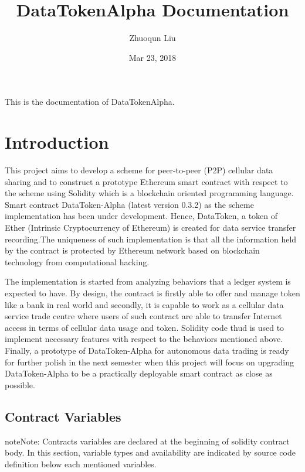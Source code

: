 \documentclass[letterpaper,10pt,english]{sphinxmanual}
\title{DataTokenAlpha Documentation}
\date{Mar 23, 2018}
\author{Zhuoqun Liu}
\begin{document}
\maketitle
\sphinxtableofcontents
{}\label{\detokenize{index::doc}}


This is the documentation of DataTokenAlpha.



\chapter{Introduction}
\label{\detokenize{index:introduction}}\label{\detokenize{index:welcome-to-datatokenalpha}}
This project aims to develop a scheme for peer-to-peer (P2P) cellular data sharing and to
construct a prototype Ethereum smart contract with respect to the scheme using Solidity which is
a blockchain oriented programming language. Smart contract DataToken-Alpha (latest version 0.3.2)
as the scheme implementation has been under development. Hence, DataToken, a token of Ether
(Intrinsic Cryptocurrency of Ethereum) is created for data service transfer recording.The uniqueness
of such implementation is that all the information held by the contract is protected by Ethereum
network based on blockchain technology from computational hacking.

The implementation is started from analyzing behaviors that a ledger system is expected to have.
By design, the contract is firstly able to offer and manage token like a bank in real world
and secondly, it is capable to work as a cellular data service trade centre where users of such
contract are able to transfer Internet access in terms of cellular data usage and token.
Solidity code thud is used to implement necessary features with respect to the behaviors mentioned above.
Finally, a prototype of DataToken-Alpha for autonomous data trading is ready for further polish
in the next semester when this project will focus on upgrading DataToken-Alpha to be a practically
deployable smart contract as close as possible.


\section{Contract Variables}
\label{\detokenize{ContractVariables:contract-variables}}\label{\detokenize{ContractVariables::doc}}
\begin{sphinxadmonition}{note}{Note:}
Contracts variables are declared at the beginning of solidity contract body.
In this section, variable types and availability are indicated by source code definition
below each mentioned variables.
\end{sphinxadmonition}
\end{document}
